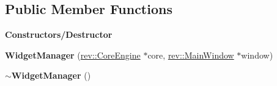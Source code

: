\subsection*{Public Member Functions}
\begin{Indent}\textbf{ Constructors/\+Destructor}\par
\begin{DoxyCompactItemize}
\item 
\mbox{\label{classrev_1_1_view_1_1_widget_manager_af33188bab6c4ee2d22faad092d397a12}} 
{\bfseries Widget\+Manager} (\mbox{\hyperlink{classrev_1_1_core_engine}{rev\+::\+Core\+Engine}} $\ast$core, \mbox{\hyperlink{classrev_1_1_main_window}{rev\+::\+Main\+Window}} $\ast$window)
\item 
\mbox{\label{classrev_1_1_view_1_1_widget_manager_aadfc1df0ee4cc429419147b983026b25}} 
{\bfseries $\sim$\+Widget\+Manager} ()
\end{DoxyCompactItemize}
\end{Indent}
